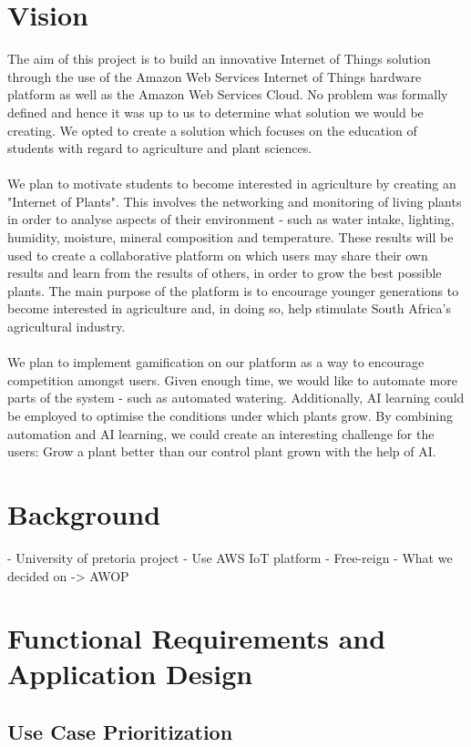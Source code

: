 \documentclass{article}
\begin{document}
\section{Vision}
The aim of this project is to build an innovative Internet of Things solution through the use of the Amazon Web Services Internet of Things hardware platform as well as the Amazon Web Services Cloud. No problem was formally defined and hence it was up to us to determine what solution we would be creating. We opted to create a solution which focuses on the education of students with regard to agriculture and plant sciences.\\\\
We plan to motivate students to become interested in agriculture by creating an "Internet of Plants". This involves the networking and monitoring of living plants in order to analyse aspects of their environment - such as water intake, lighting, humidity, moisture, mineral composition and temperature. These results will be used to create a collaborative platform on which users may share their own results and learn from the results of others, in order to grow the best possible plants. The main purpose of the platform is to encourage younger generations to become interested in agriculture and, in doing so, help stimulate South Africa's agricultural industry.\\\\
We plan to implement gamification on our platform as a way to encourage competition amongst users. Given enough time, we would like to automate more parts of the system - such as automated watering. Additionally, AI learning could be employed to optimise the conditions under which plants grow. By combining automation and AI learning, we could create an interesting challenge for the users: Grow a plant better than our control plant grown with the help of AI.

\section{Background}
	- University of pretoria project
	- Use AWS IoT platform
	- Free-reign
	- What we decided on -> AWOP

\section{Functional Requirements and Application Design}
	\subsection{Use Case Prioritization}
\end{document}
